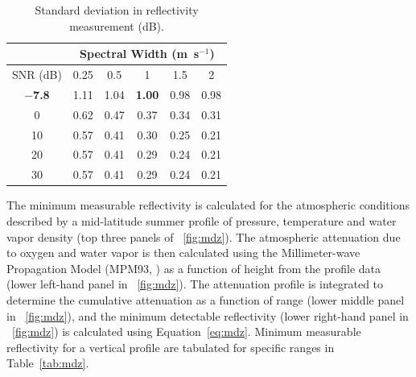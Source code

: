 \documentclass[12pt,letterpaper]{article}
\begin{document}
\begin{table}[htbp]
  \renewcommand{\extrarowheight}{2pt}
  \centering
  \caption{Standard deviation in reflectivity measurement (dB).}
  \label{tab:deltaZ}
  \vspace{0.5em}
  \begin{tabular}{|c|c|c|c|c|c|}
    \hline
    ~ & \multicolumn{5}{c|}{Spectral Width (m~s$^{-1}$)} \\
    \hline
    SNR (dB) & 0.25 & 0.5 & 1 & 1.5 & 2 \\
    \hline
    $\mathbf{-}$\textbf{7.8} & 1.11 & 1.04 & \textbf{1.00} & 0.98 & 0.98 \\
     0 & 0.62 & 0.47 & 0.37 & 0.34 & 0.31 \\
    10 & 0.57 & 0.41 & 0.30 & 0.25 & 0.21 \\
    20 & 0.57 & 0.41 & 0.29 & 0.24 & 0.21 \\
    30 & 0.57 & 0.41 & 0.29 & 0.24 & 0.21 \\
    \hline
  \end{tabular}
\end{table}

The minimum measurable reflectivity is calculated for the atmospheric
conditions described by a mid-latitude summer profile of pressure,
temperature and water vapor density (top three panels of
\figurename~\ref{fig:mdz}). The atmospheric attenuation due to oxygen
and water vapor is then calculated using the Millimeter-wave
Propagation Model (MPM93, \cite{liebe:93}) as a function of height
from the profile data (lower left-hand panel in
\figurename~\ref{fig:mdz}). The attenuation profile is integrated to
determine the cumulative attenuation as a function of range (lower
middle panel in \figurename~\ref{fig:mdz}), and the minimum detectable
reflectivity (lower right-hand panel in \figurename~\ref{fig:mdz}) is
calculated using Equation~\ref{eq:mdz}. Minimum measurable
reflectivity for a vertical profile are tabulated for specific ranges
in Table~\ref{tab:mdz}.
\end{document}
